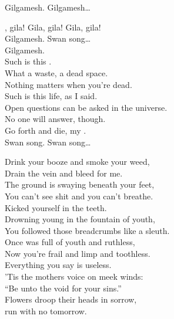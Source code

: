 Gilgamesh. Gilgamesh… \\


, gila! Gila, gila! Gila, gila! \\

Gilgamesh. Swan song… \\

Gilgamesh. \\

Such is this . \\
What a waste, a dead space. \\
Nothing matters when you're dead. \\
Such is this life, as I said. \\
Open questions can be asked in the universe. \\
No one will answer, though. \\
Go forth and die, my . \\

Swan song. Swan song… \\




Drink your booze and smoke your weed, \\
Drain the vein and bleed for me. \\
The ground is swaying beneath your feet, \\
You can't see shit and you can't breathe. \\
Kicked yourself in the teeth. \\

Drowning young in the fountain of youth, \\
You followed those breadcrumbs like a sleuth. \\
Once was full of youth and ruthless, \\
Now you're frail and limp and toothless. \\
Everything you say is useless. \\

'Tis the mothers voice on meek winds: \\
``Be unto the void for your sins.'' \\
Flowers droop their heads in sorrow, \\
 run with no tomorrow. \\

